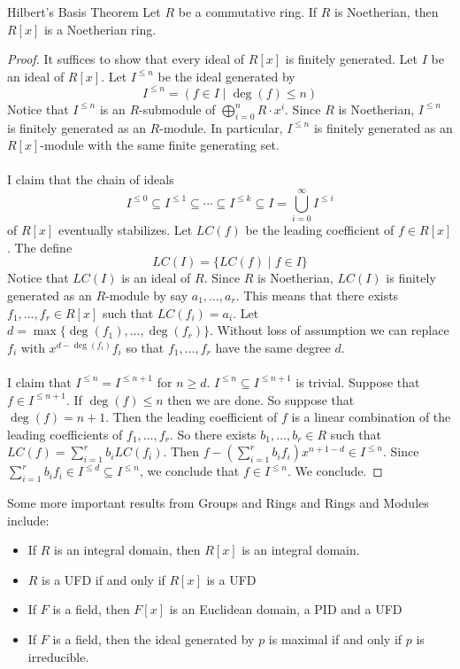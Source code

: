 \documentclass[a4paper]{article}
\begin{document}
\begin{thm}{Hilbert's Basis Theorem}{} Let $R$ be a commutative ring. If $R$ is Noetherian, then $R[x]$ is a Noetherian ring. \tcbline
\begin{proof}
It suffices to show that every ideal of $R[x]$ is finitely generated. Let $I$ be an ideal of $R[x]$. Let $I^{\leq n}$ be the ideal generated by $$I^{\leq n}=(f\in I\;|\;\deg(f)\leq n)$$ Notice that $I^{\leq n}$ is an $R$-submodule of $\bigoplus_{i=0}^nR\cdot x^i$. Since $R$ is Noetherian, $I^{\leq n}$ is finitely generated as an $R$-module. In particular, $I^{\leq n}$ is finitely generated as an $R[x]$-module with the same finite generating set. \\~\\

I claim that the chain of ideals $$I^{\leq 0}\subseteq I^{\leq 1}\subseteq\cdots\subseteq I^{\leq k}\subseteq I=\bigcup_{i=0}^\infty I^{\leq i}$$ of $R[x]$ eventually stabilizes. Let $LC(f)$ be the leading coefficient of $f\in R[x]$. The define $$LC(I)=\{LC(f)\;|\;f\in I\}$$ Notice that $LC(I)$ is an ideal of $R$. Since $R$ is Noetherian, $LC(I)$ is finitely generated as an $R$-module by say $a_1,\dots,a_r$. This means that there exists $f_1,\dots,f_r\in R[x]$ such that $LC(f_i)=a_i$. Let $d=\max\{\deg(f_1),\dots,\deg(f_r)\}$. Without loss of assumption we can replace $f_i$ with $x^{d-\deg(f_i)}f_i$ so that $f_1,\dots,f_r$ have the same degree $d$. \\~\\

I claim that $I^{\leq n}=I^{\leq n+1}$ for $n\geq d$. $I^{\leq n}\subseteq I^{\leq n+1}$ is trivial. Suppose that $f\in I^{\leq n+1}$. If $\deg(f)\leq n$ then we are done. So suppose that $\deg(f)=n+1$. Then the leading coefficient of $f$ is a linear combination of the leading coefficients of $f_1,\dots,f_r$. So there exists $b_1,\dots,b_r\in R$ such that $LC(f)=\sum_{i=1}^rb_iLC(f_i)$. Then $f-\left(\sum_{i=1}^rb_if_i\right)x^{n+1-d}\in I^{\leq n}$. Since $\sum_{i=1}^rb_if_i\in I^{\leq d}\subseteq I^{\leq n}$, we conclude that $f\in I^{\leq n}$. We conclude. 
\end{proof}
\end{thm}

Some more important results from Groups and Rings and Rings and Modules include: 
\begin{itemize}
\item If $R$ is an integral domain, then $R[x]$ is an integral domain. 
\item $R$ is a UFD if and only if $R[x]$ is a UFD
\item If $F$ is a field, then $F[x]$ is an Euclidean domain, a PID and a UFD
\item If $F$ is a field, then the ideal generated by $p$ is maximal if and only if $p$ is irreducible. 
\end{itemize}
\end{document}
